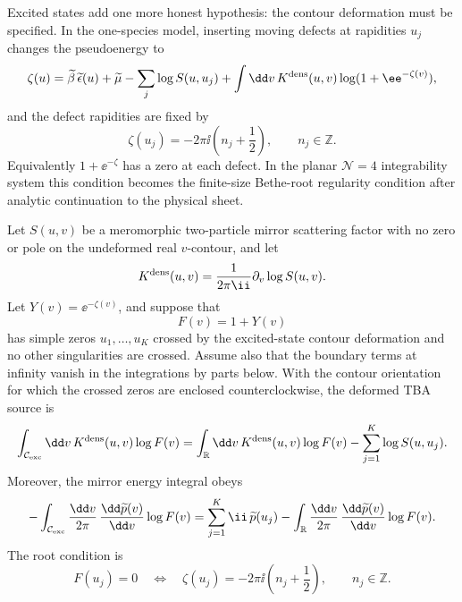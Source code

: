 Excited states add one more honest hypothesis: the contour deformation must be
specified.  In the one-species model, inserting moving defects at rapidities
\(u_j\) changes the pseudoenergy to
\[
  \zeta(u)
  =
  \widetilde\beta\,\widetilde\epsilon(u)+\widetilde\mu
  -
  \sum_j\log S(u,u_j)
  +
  \int\dd v\,K^{\rm dens}(u,v)\log(1+\ee^{-\zeta(v)}),
\]
and the defect rapidities are fixed by
\[
  \zeta(u_j)=-2\pi\ii\left(n_j+\frac12\right),
  \qquad n_j\in\mathbb Z.
\]
Equivalently \(1+\ee^{-\zeta}\) has a zero at each defect.  In the planar
\(\mathcal N=4\) integrability system this condition becomes the finite-size
Bethe-root regularity condition after analytic continuation to the physical
sheet.

\begin{lemma}
\label{lem:one-species-excited-contour-deformation}
Let \(S(u,v)\) be a meromorphic two-particle mirror scattering factor with
no zero or pole on the undeformed real \(v\)-contour, and let
\[
  K^{\rm dens}(u,v)=\frac{1}{2\pi\ii}\partial_v\log S(u,v).
\]
Let \(Y(v)=\ee^{-\zeta(v)}\), and suppose that
\[
  F(v)=1+Y(v)
\]
has simple zeros \(u_1,\ldots,u_K\) crossed by the excited-state contour
deformation and no other singularities are crossed.  Assume also that the
boundary terms at infinity vanish in the integrations by parts below.  With
the contour orientation for which the crossed zeros are enclosed
counterclockwise, the deformed TBA source is
\begin{equation}
  \int_{\mathcal C_{\rm exc}}\dd v\,
  K^{\rm dens}(u,v)\log F(v)
  =
  \int_{\mathbb R}\dd v\,
  K^{\rm dens}(u,v)\log F(v)
  -
  \sum_{j=1}^K \log S(u,u_j).
  \label{eq:one-species-excited-source-residue}
\end{equation}
Moreover, the mirror energy integral obeys
\begin{equation}
  -\int_{\mathcal C_{\rm exc}}\frac{\dd v}{2\pi}\,
  \frac{\dd\widetilde p(v)}{\dd v}\log F(v)
  =
  \sum_{j=1}^K \ii\,\widetilde p(u_j)
  -
  \int_{\mathbb R}\frac{\dd v}{2\pi}\,
  \frac{\dd\widetilde p(v)}{\dd v}\log F(v).
  \label{eq:one-species-excited-energy-residue}
\end{equation}
The root condition is
\begin{equation}
  F(u_j)=0
  \quad\Longleftrightarrow\quad
  \zeta(u_j)=-2\pi\ii\left(n_j+\frac12\right),
  \qquad n_j\in\mathbb Z.
  \label{eq:one-species-excited-root-quantization}
\end{equation}
\end{lemma}

